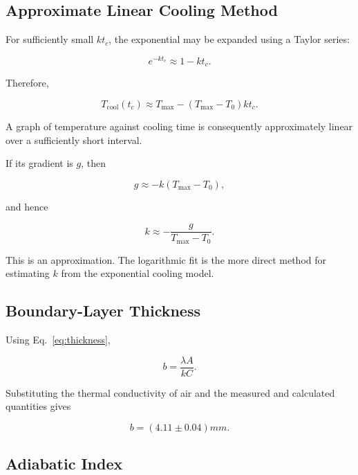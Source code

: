 \documentclass[12pt,a4paper]{article}
\begin{document}
\subsection{Approximate Linear Cooling Method}

For sufficiently small $kt_c$, the exponential may be expanded
using a Taylor series:

\begin{equation}
    e^{-kt_c}\approx 1-kt_c.
\end{equation}

Therefore,

\begin{equation}
    T_{\mathrm{cool}}(t_c)
    \approx T_{\max}-(T_{\max}-T_0)kt_c.
\end{equation}

A graph of temperature against cooling time is consequently
approximately linear over a sufficiently short interval.

If its gradient is $g$, then

\begin{equation}
    g\approx-k(T_{\max}-T_0),
\end{equation}

and hence

\begin{equation}
    \boxed{
    k\approx-\frac{g}{T_{\max}-T_0}
    }.
\end{equation}

This is an approximation. The logarithmic fit is the more direct
method for estimating $k$ from the exponential cooling model.

\subsection{Boundary-Layer Thickness}

Using Eq.~\eqref{eq:thickness},

\begin{equation}
    b=\frac{\lambda A}{kC}.
\end{equation}

Substituting the thermal conductivity of air and the measured
and calculated quantities gives

\begin{equation*}
    b=(4.11 \pm 0.04) \si{mm}.
\end{equation*}

\subsection{Adiabatic Index}
\end{document}
